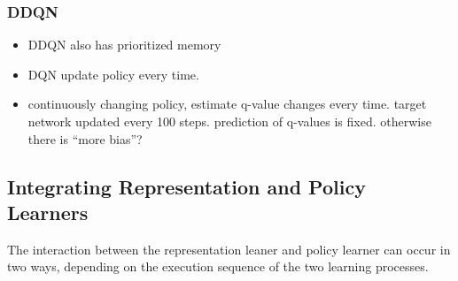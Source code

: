 \subsubsection{DDQN}
\begin{itemize}
	\item DDQN \citep{DDQN} also has prioritized memory 
	\item DQN update policy every time. 
	\item continuously changing policy, estimate q-value changes every time.
	target network updated every 100 steps. prediction of q-values is fixed. otherwise there is ``more bias''?
\end{itemize}

\subsection{Integrating Representation and Policy Learners}
The interaction between the representation leaner and policy learner can occur in two ways, depending on the execution sequence of the two learning processes.

